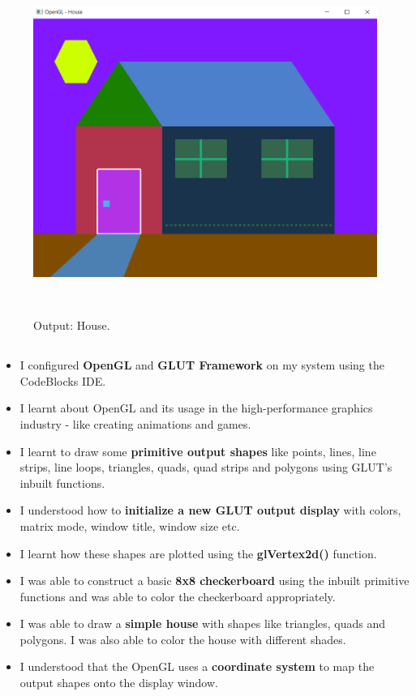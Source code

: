 \documentclass[12pt, a4]{article}
\begin{document}
\newpage
\subsection*{}
\begin{figure}[h]
\centering
\caption{Output: House.}
\includegraphics[height=11.25cm, width=15cm]{House/Output.png}
\end{figure}

\newpage
\subsection*{}
\begin{itemize}
\item I configured \textbf{OpenGL} and \textbf{GLUT Framework} on my system using the CodeBlocks IDE.
\item I learnt about OpenGL and its usage in the high-performance graphics industry - like creating animations and games.
\item I learnt to draw some \textbf{primitive output shapes} like points, lines, line strips, line loops, triangles, quads, quad strips and polygons using GLUT's inbuilt functions.
\item I understood how to \textbf{initialize a new GLUT output display} with colors, matrix mode, window title, window size etc.
\item I learnt how these shapes are plotted using the \textbf{glVertex2d()} function.
\item I was able to construct a basic \textbf{8x8 checkerboard} using the inbuilt primitive functions and was able to color the checkerboard appropriately.
\item I was able to draw a \textbf{simple house} with shapes like triangles, quads and polygons. I was also able to color the house with different shades.
\item I understood that the OpenGL uses a \textbf{coordinate system} to map the output shapes onto the display window. 

\end{itemize}
\end{document}
